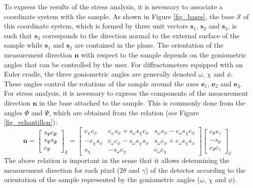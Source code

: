 \documentclass[french,a4paper]{report}
\begin{document}
To express the results of the stress analysis, it is necessary to associate a coordinate system with the sample. As shown in Figure \ref{fig_bases}, the base $\mathcal{S}$ of this coordinate system, which is formed by three unit vectors $\boldsymbol s_1$, $\boldsymbol s_2$ and $\boldsymbol s_3$, is such that $\boldsymbol s_3$ corresponds to the direction normal to the external surface of the sample while $\boldsymbol s_1$ and $\boldsymbol s_2$ are contained in the plane. The orientation of the measurement direction $\boldsymbol n$ with respect to the sample depends on the goniometric angles that can be controlled by the user. For diffractometers equipped with an Euler cradle, the three goniometric angles are generally denoted $\omega$, $\chi$ and $\phi$. These angles control the rotations of the sample around the axes $\boldsymbol e_1$, $\boldsymbol e_2$ and $\boldsymbol e_3$. For stress analysis, it is necessary to express the components of the measurement direction $\boldsymbol n$ in the base attached to the sample. This is commonly done from the angles $\Phi$ and $\Psi$, which are obtained from the relation (see Figure \ref{fig_echantillon}): 
\begin{equation}
\boldsymbol n =
\begin{bmatrix}
s_\Psi c_\Phi \\
s_\Psi s_\Phi \\
c_\Psi 
\end{bmatrix}_{\mathcal{S}}
=
\begin{bmatrix}
c_\chi c_\phi & c_\omega s_\phi + s_\omega s_\chi c_\phi & s_\omega s_\phi - c_\omega s_\chi c_\phi \\
-c_\chi s_\phi  & c_\omega c_\phi - s_\omega s_\chi s_\phi &   s_\omega c_\phi + c_\omega s_\chi s_\phi\\
s_\chi & -s_\omega  c_\chi & c_\omega  c_\chi  
\end{bmatrix}
\begin{bmatrix}
c_\theta s_\gamma \\
-s_\theta  \\
c_\theta c_\gamma
\end{bmatrix}_{\mathcal{E}}
\end{equation}
The above relation is important in the sense that it allows determining the measurement direction for each pixel ($2 \theta$ and $\gamma$) of the detector according to the orientation of the sample represented by the goniometric angles ($ \omega$, $\chi$ and $\phi$).
\end{document}
